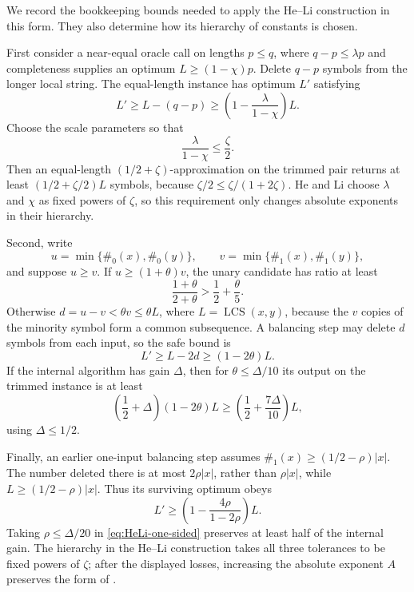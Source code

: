 \documentclass[11pt]{article}
\theoremstyle{remark}
\newcommand{\LCS}{\operatorname{LCS}}
\begin{document}
We record the bookkeeping bounds needed to apply the He--Li
construction in this form.  They also determine how its hierarchy of
constants is chosen.

First consider a near-equal oracle call on lengths $p\le q$, where
$q-p\le\lambda p$ and completeness supplies an optimum
$L\ge(1-\chi)p$.  Delete $q-p$ symbols from the longer local string.
The equal-length instance has optimum $L'$ satisfying
\begin{equation}\label{eq:near-equal-loss}
 L'\ge L-(q-p)
 \ge\left(1-\frac{\lambda}{1-\chi}\right)L.
\end{equation}
Choose the scale parameters so that
\begin{equation}\label{eq:near-equal-hierarchy}
 \frac{\lambda}{1-\chi}\le\frac\zeta2.
\end{equation}
Then an equal-length $(1/2+\zeta)$-approximation on the trimmed pair
returns at least $(1/2+\zeta/2)L$ symbols, because
$\zeta/2\le\zeta/(1+2\zeta)$.  He and Li choose $\lambda$ and $\chi$
as fixed powers of $\zeta$, so this requirement only changes absolute
exponents in their hierarchy.

Second, write
\[
 u=\min\{\#_0(x),\#_0(y)\},\qquad
 v=\min\{\#_1(x),\#_1(y)\},
\]
and suppose $u\ge v$.  If $u\ge(1+\theta)v$, the unary candidate has
ratio at least
\[
 \frac{1+\theta}{2+\theta}>\frac12+\frac\theta5.
\]
Otherwise $d=u-v<\theta v\le\theta L$, where
$L=\LCS(x,y)$, because the $v$ copies of the minority symbol form a
common subsequence.  A balancing step may delete $d$ symbols from
each input, so the safe bound is
\begin{equation}\label{eq:HeLi-two-sided}
 L'\ge L-2d\ge(1-2\theta)L.
\end{equation}
If the internal algorithm has gain $\Delta$, then for
$\theta\le\Delta/10$ its output on the trimmed instance is at least
\[
 \left(\frac12+\Delta\right)(1-2\theta)L
 \ge\left(\frac12+\frac{7\Delta}{10}\right)L,
\]
using $\Delta\le1/2$.

Finally, an earlier one-input balancing step assumes
$\#_1(x)\ge(1/2-\rho)|x|$.  The number deleted there is at most
$2\rho|x|$, rather than $\rho|x|$, while
$L\ge(1/2-\rho)|x|$.  Thus its surviving optimum obeys
\begin{equation}\label{eq:HeLi-one-sided}
 L'\ge
 \left(1-\frac{4\rho}{1-2\rho}\right)L.
\end{equation}
Taking $\rho\le\Delta/20$ in \eqref{eq:HeLi-one-sided} preserves at
least half of the internal gain.  The hierarchy in the He--Li
construction takes all three tolerances to be fixed powers of
$\zeta$; after the displayed losses, increasing the absolute exponent
$A$ preserves the form of .
\end{document}
